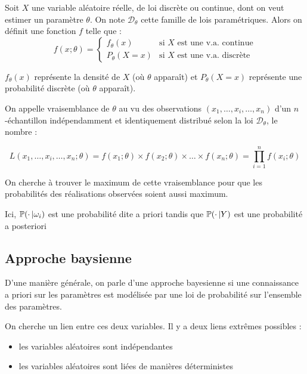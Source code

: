 \begin{definition}[EMV]

Soit $X$ une variable aléatoire réelle, de loi discrète ou continue, dont on veut estimer un paramètre $\theta$. On note $ {\mathcal {D}}_{\theta }$ cette famille de lois paramétriques. Alors on définit une fonction $f$ telle que :
  \[
        {\displaystyle f(x;\theta )={\begin{cases}f_{\theta }(x)&{\text{si }}X{\text{ est une v.a. continue}}\\P_{\theta }(X=x)&{\text{si }}X{\text{ est une v.a. discrète}}\end{cases}}} 
  \]

    $ f_{\theta }(x)$ représente la densité de $X$ (où $\theta$ apparaît) et  $P_{\theta }(X=x)$ représente une probabilité discrète (où $\theta$ apparaît).

On appelle vraisemblance de $\theta$ au vu des observations $(x_{1},\ldots ,x_{i},\ldots ,x_{n})$ d'un $n$-échantillon indépendamment et identiquement distribué selon la loi $ {\mathcal {D}}_{\theta }$, le nombre :

    \[  {\displaystyle L(x_{1},\ldots ,x_{i},\ldots ,x_{n};\theta )=f(x_{1};\theta )\times f(x_{2};\theta )\times \ldots \times f(x_{n};\theta )=\prod _{i=1}^{n}f(x_{i};\theta )} \]
\end{definition}
On cherche à trouver le maximum de cette vraisemblance pour que les probabilités des réalisations observées soient aussi maximum.

Ici, $\P(\cdot \, \vert \omega_i)$ est une probabilité dite \og a priori \fg{} tandis que $\P( \cdot \, \vert Y)$ est une probabilité \og a posteriori \fg{}

\subsection{Approche baysienne}

D'une manière générale, on parle d'une approche \og bayesienne \fg{} si une connaissance \og a priori \fg{} sur les paramètres est modélisée par une loi de probabilité sur l'ensemble des paramètres.

On cherche un lien entre ces deux variables. Il y a deux liens \og extrêmes possibles \fg{} :
\begin{itemize}
\item les variables aléatoires sont indépendantes
  \item les variables aléatoires sont liées de manières déterministes
\end{itemize}

